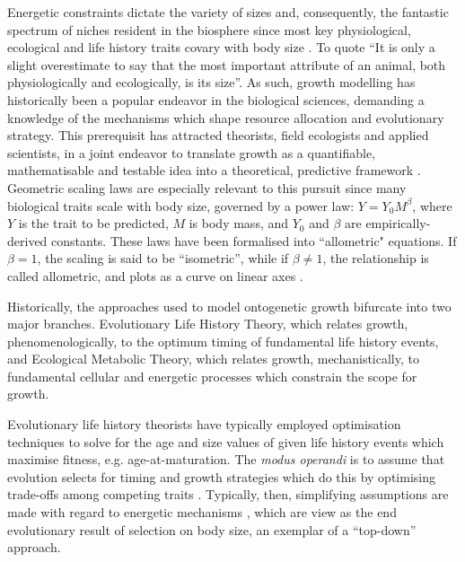 \documentclass[a4paper]{article} %
\begin{document}
    Energetic constraints dictate the variety of sizes and, consequently, the fantastic spectrum of niches resident in the biosphere since most key physiological, ecological and life history traits covary with body size \autocite{peters1983, brown2000-scaling-book,schmidt1984scaling,Marshall2019b}. To quote \textcite{Bartholomew1981} ``It is only a slight overestimate to say that the most important attribute of an animal, both physiologically and ecologically, is its size''. As such, growth modelling has historically been a popular endeavor in the biological sciences, demanding a knowledge of the mechanisms which shape resource allocation and evolutionary strategy. This prerequisit has attracted theorists, field ecologists and applied scientists, in a joint endeavor to translate growth as a quantifiable, mathematisable and testable idea into a theoretical, predictive framework \autocite{popper1962,popper1972,peters1983, West2011}. Geometric scaling laws are especially relevant to this pursuit since many biological traits scale with body size, governed by a power law: $Y = Y_0 M^{\beta}$, where $Y$ is the trait to be predicted, $M$ is body mass, and $Y_0$ and $\beta$ are empirically-derived constants. These laws have been formalised into ``allometric" equations. If $\beta = 1$, the scaling is said to be ``isometric'', while if $\beta \neq 1$, the relationship is called allometric, and plots as a curve on linear axes \autocite{brown2000-scaling-book}.

    Historically, the approaches used to model ontogenetic growth bifurcate into two major branches. Evolutionary Life History Theory, which relates growth, phenomenologically, to the optimum timing of fundamental life history events, and Ecological Metabolic Theory, which relates growth, mechanistically, to fundamental cellular and energetic processes which constrain the scope for growth.
        
    Evolutionary life history theorists have typically employed optimisation techniques to solve for the age and size values of given life history events which maximise fitness, e.g. age-at-maturation. The \textit{modus operandi} is to assume that evolution selects for timing and growth strategies which do this by optimising trade-offs among competing traits \autocite{Day1997, Stearns1989, stearns1992evolution}. Typically, then, simplifying assumptions are made with regard to energetic mechanisms \autocite{Day1997, Kozowski1987-indeterminate}, which are view as the end evolutionary result of selection on body size, an exemplar of a ``top-down'' approach.
        
\end{document}
